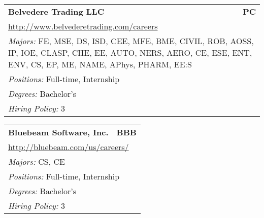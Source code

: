 \documentclass[twoside]{article}
\begin{document}
\begin{center}
\begin{multicols}{3}
\begin{FlushLeft}
\begin{minipage}{.9\columnwidth}\begin{tabularx}{.95\columnwidth}{Xr}
                 {\Large\bf Belvedere Trading LLC} & {\Large\bf PC}\\
    \multicolumn{2}{p{.95\columnwidth}}{\url{http://www.belvederetrading.com/careers}}\\
    \multicolumn{2}{p{.95\columnwidth}}{\emph{Majors:} FE, MSE, DS, ISD, CEE, MFE, BME, CIVIL, ROB, AOSS, IP, IOE, CLASP, CHE, EE, AUTO, NERS, AERO, CE, ESE, ENT, ENV, CS, EP, ME, NAME, APhys, PHARM, EE:S}\\
    \multicolumn{2}{p{.95\columnwidth}}{\emph{Positions:} Full-time, Internship}\\
    \multicolumn{2}{p{.95\columnwidth}}{\emph{Degrees:} Bachelor's}\\
    \multicolumn{2}{p{.95\columnwidth}}{\emph{Hiring Policy:} 3}\\
    \end{tabularx}
    
\end{minipage}
 
\begin{minipage}{.9\columnwidth}\begin{tabularx}{.95\columnwidth}{Xr}
                 {\Large\bf Bluebeam Software, Inc.} & {\Large\bf BBB}\\
    \multicolumn{2}{p{.95\columnwidth}}{\url{http://bluebeam.com/us/careers/}}\\
    \multicolumn{2}{p{.95\columnwidth}}{\emph{Majors:} CS, CE}\\
    \multicolumn{2}{p{.95\columnwidth}}{\emph{Positions:} Full-time, Internship}\\
    \multicolumn{2}{p{.95\columnwidth}}{\emph{Degrees:} Bachelor's}\\
    \multicolumn{2}{p{.95\columnwidth}}{\emph{Hiring Policy:} 3}\\
    \end{tabularx}
    
\end{minipage}
 

\end{FlushLeft}
\end{multicols}
\end{center}
\end{document}
